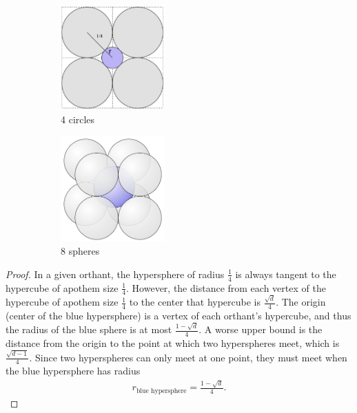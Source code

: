 \documentclass{article} %
\theoremstyle{plain}
\numberwithin{equation}{section} %
\numberwithin{figure}{section} %
\numberwithin{table}{section} %
\begin{document}
\begin{figure}[ht!]
\centering
\begin{subfigure}{.5\textwidth}
    \centering
    \includegraphics[width=40mm]{figures/4circles1}
    \caption{4 circles}
    \label{fig1}
\end{subfigure}%
\begin{subfigure}{.5\textwidth}
    \centering
    \includegraphics[width=40mm]{figures/8spheres}
    \caption{8 spheres}
    \label{fig2}
\end{subfigure}
\caption{}
\label{fig:test}
\end{figure}

\begin{proof}
    In a given orthant, the hypersphere of radius $\frac{1}{4}$ is always tangent to the hypercube of apothem size $\frac{1}{4}$.  However, the distance from each vertex of the hypercube of apothem size $\frac{1}{4}$ to the center that hypercube is $\frac{\sqrt{d}}{4}$.  The origin (center of the blue hypersphere) is a vertex of each orthant's hypercube, and thus the radius of the blue sphere is at most $\frac{1 - \sqrt{d}}{4}$.  A worse upper bound is the distance from the origin to the point at which two hyperspheres meet, which is $\frac{\sqrt{d-1}}{4}$.  Since two hyperspheres can only meet at one point, they must meet when the blue hypersphere has radius
    \begin{align*}
        r_{\text{blue hypersphere}} = \frac{1 - \sqrt{d}}{4}.
    \end{align*}
\end{proof}
\end{document}
